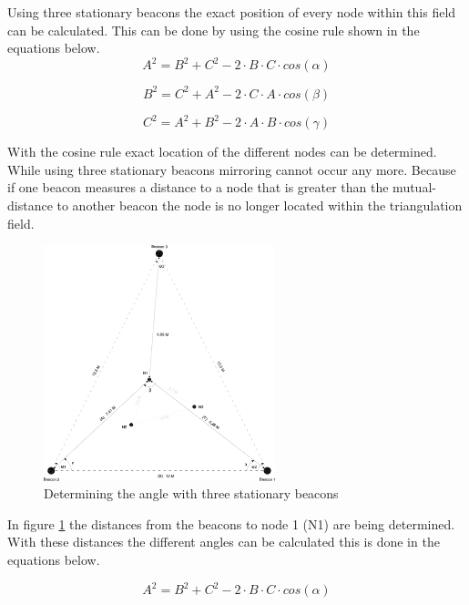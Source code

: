 \documentclass[10pt,a4paper]{article}
\begin{document}
Using three stationary beacons the exact position of every node within this field can be calculated. This can be done by using the cosine rule shown in the equations below. 
\begin{equation}
A^2 = B^2 + C^2 - 2\cdot B\cdot C\cdot cos(\alpha)
\end{equation}

\begin{equation}
B^2 = C^2 + A^2 - 2\cdot C\cdot A\cdot cos(\beta)
\end{equation}

\begin{equation}
C^2 = A^2 + B^2 - 2\cdot A\cdot B\cdot cos(\gamma)
\end{equation}

With the cosine rule exact location of the different nodes can be determined. While using three stationary beacons mirroring cannot occur any more. Because if one beacon measures a distance to a node that is greater than the mutual-distance to another beacon the node is no longer located within the triangulation field.

\begin{figure}[H]
\centering
\includegraphics[width=0.6\textwidth]{triangulatie.pdf}
\caption{Determining the angle with three stationary beacons}
\label{triangulatie}
\end{figure}

In figure \ref{triangulatie} the distances from the beacons to node 1 (N1) are being determined. With these distances the different angles can be calculated this is done in the equations below.

\begin{equation}
A^2 = B^2 + C^2 - 2\cdot B\cdot C\cdot cos(\alpha)
\end{equation}
\end{document}
